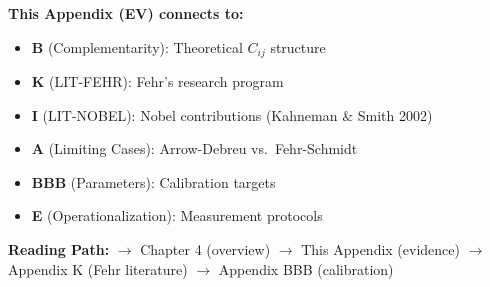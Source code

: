\begin{tcolorbox}[colback=gray!10!white, colframe=gray!75!black,
    title=\textbf{Cross-Reference Footer}]
\label{sec:EV-footer}

\textbf{This Appendix (EV) connects to:}
\begin{itemize}[nosep]
    \item \textbf{B} (Complementarity): Theoretical $C_{ij}$ structure
    \item \textbf{K} (LIT-FEHR): Fehr's research program
    \item \textbf{I} (LIT-NOBEL): Nobel contributions (Kahneman \& Smith 2002)
    \item \textbf{A} (Limiting Cases): Arrow-Debreu vs.\ Fehr-Schmidt
    \item \textbf{BBB} (Parameters): Calibration targets
    \item \textbf{E} (Operationalization): Measurement protocols
\end{itemize}

\textbf{Reading Path:}
$\rightarrow$ Chapter 4 (overview) $\rightarrow$ This Appendix (evidence)
$\rightarrow$ Appendix K (Fehr literature) $\rightarrow$ Appendix BBB (calibration)

\end{tcolorbox}

